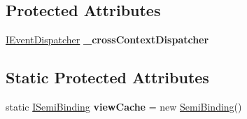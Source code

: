 \subsection*{Protected Attributes}
\begin{DoxyCompactItemize}
\item 
\hypertarget{classbabel_1_1extensions_1_1context_1_1impl_1_1_m_v_c_s_context_a546e15e254e17fa6b84c4ba1a2f44028}{\hyperlink{interfacebabel_1_1extensions_1_1dispatcher_1_1eventdispatcher_1_1api_1_1_i_event_dispatcher}{I\-Event\-Dispatcher} {\bfseries \-\_\-cross\-Context\-Dispatcher}}\label{classbabel_1_1extensions_1_1context_1_1impl_1_1_m_v_c_s_context_a546e15e254e17fa6b84c4ba1a2f44028}

\end{DoxyCompactItemize}
\subsection*{Static Protected Attributes}
\begin{DoxyCompactItemize}
\item 
\hypertarget{classbabel_1_1extensions_1_1context_1_1impl_1_1_m_v_c_s_context_a9052bb9a49fac3144a50ebab189068fa}{static \hyperlink{interfacebabel_1_1framework_1_1api_1_1_i_semi_binding}{I\-Semi\-Binding} {\bfseries view\-Cache} = new \hyperlink{classbabel_1_1framework_1_1impl_1_1_semi_binding}{Semi\-Binding}()}\label{classbabel_1_1extensions_1_1context_1_1impl_1_1_m_v_c_s_context_a9052bb9a49fac3144a50ebab189068fa}

\end{DoxyCompactItemize}
